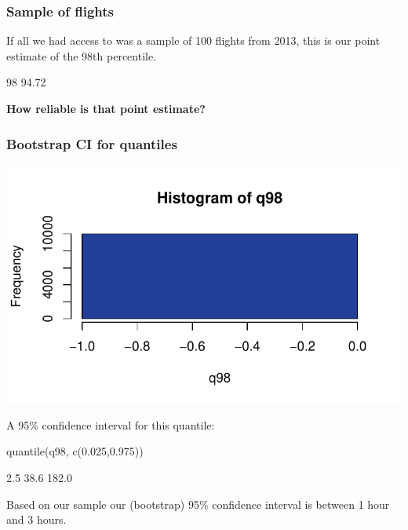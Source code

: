 \documentclass[a4paper]{article}\usepackage[]{graphicx}\usepackage[]{xcolor}
\makeatletter
\def\maxwidth{ %
  \ifdim\Gin@nat@width>\linewidth
    \linewidth
  \else
    \Gin@nat@width
  \fi
}
\makeatother
\begin{document}
\subsubsection{Sample of flights}
If all we had access to was a sample of 100 flights from 2013, this is our point estimate of the 98th percentile.
\begin{Schunk}
\begin{Soutput}
  98%
94.72 
\end{Soutput}
\end{Schunk}
\begin{greenbox}
	\textbf{How reliable is that point estimate?}
\end{greenbox}
\subsubsection{Bootstrap CI for quantiles}
\begin{Schunk}


{\centering \includegraphics[width=\maxwidth]{figure/listings-unnamed-chunk-179-1} 

}

\end{Schunk}
A 95\% confidence interval for this quantile:
\begin{Schunk}
\begin{Sinput}
quantile(q98, c(0.025,0.975))
\end{Sinput}
\begin{Soutput}
 2.5%
 38.6 182.0 
\end{Soutput}
\end{Schunk}
Based on our sample our (bootstrap) 95\% confidence interval is between 1 hour and 3 hours.
\end{document}
